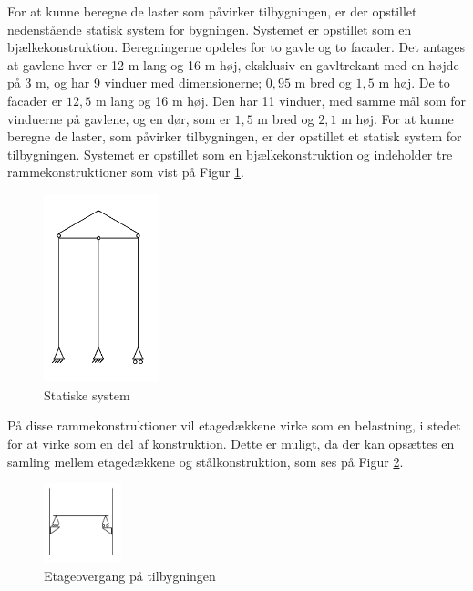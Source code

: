 For at kunne beregne de laster som påvirker tilbygningen, er der opstillet nedenstående statisk system for bygningen. Systemet er opstillet som en bjælkekonstruktion.
\newline
\newline
Beregningerne opdeles for to gavle og to facader. Det antages at gavlene hver er 12 m lang og 16 m høj, eksklusiv en gavltrekant med en højde på 3 m, og har 9 vinduer med dimensionerne; $0,\!95$ m bred og $1,\!5$ m høj.
\newline
\newline
De to facader er $12,\!5$ m lang og 16 m høj. Den har 11 vinduer, med samme mål som for vinduerne på gavlene, og en dør, som er $1,\!5$ m bred og $2,\!1$ m høj.
\newline
\newline
For at kunne beregne de laster, som påvirker tilbygningen, er der opstillet et statisk system for tilbygningen. Systemet er opstillet som en bjælkekonstruktion og indeholder tre rammekonstruktioner som vist på Figur \ref{fig:system}.

\begin{figure}[htbp]
	\centering
	\includegraphics[width=0.3\textwidth]{billeder/del1statiskesystem.png}
	\caption{Statiske system}
	\label{fig:system}
\end{figure}

På disse rammekonstruktioner vil etagedækkene virke som en belastning, i stedet for at virke som en del af konstruktion. Dette er muligt, da der kan opsættes en samling mellem etagedækkene og stålkonstruktion, som ses på Figur \ref{fig:etage}.

\begin{figure}[htbp]
	\centering
	\includegraphics[width=0.2\textwidth]{billeder/etageovergang.png}
	\caption{Etageovergang på tilbygningen}
	\label{fig:etage}
\end{figure}

